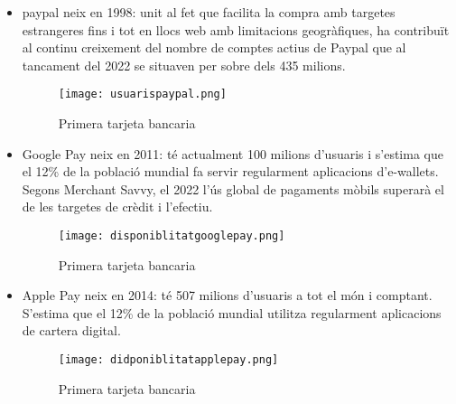 \begin{itemize}
    \item paypal neix en 1998: unit al fet que facilita la compra amb targetes estrangeres fins i tot en llocs web amb limitacions geogràfiques, ha contribuït al continu creixement del nombre de comptes actius de Paypal que al tancament del 2022 se situaven per sobre dels 435 milions.
    \begin{figure}[h]
        \centering
        \texttt{[image: usuarispaypal.png]}
        \caption{Primera tarjeta bancaria}
    \end{figure}  
    \item Google Pay neix en 2011: té actualment 100 milions d'usuaris i s'estima que el 12\% de la població mundial fa servir regularment aplicacions d'e-wallets. Segons Merchant Savvy, el 2022 l'ús global de pagaments mòbils superarà el de les targetes de crèdit i l'efectiu.
    \begin{figure}[h]
        \centering
        \texttt{[image: disponiblitatgooglepay.png]}
        \caption{Primera tarjeta bancaria}
    \end{figure}  
    \item Apple Pay neix en 2014: té 507 milions d'usuaris a tot el món i comptant. S'estima que el 12\% de la població mundial utilitza regularment aplicacions de cartera digital.
    \begin{figure}[h]
        \centering
        \texttt{[image: didponiblitatapplepay.png]}
        \caption{Primera tarjeta bancaria}
    \end{figure}  
\end{itemize}












